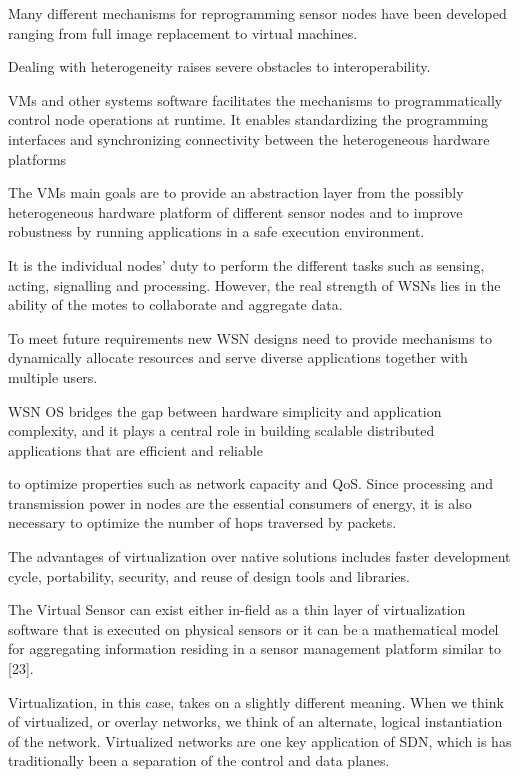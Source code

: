 Many different mechanisms for reprogramming sensor nodes have been developed ranging from full image replacement to virtual machines.

Dealing with heterogeneity raises severe obstacles to interoperability.

VMs and other systems software facilitates the mechanisms to programmatically control node operations at runtime. It enables 
standardizing the programming interfaces and synchronizing connectivity between the heterogeneous hardware platforms

The VMs main goals are to provide an abstraction layer from the possibly heterogeneous hardware platform of different sensor nodes and to improve robustness by running applications in a safe execution environment. 

It is the individual nodes' duty to perform the different tasks such as sensing, acting, signalling and processing. However, the real strength of WSNs lies in the ability of the motes to collaborate and aggregate data.  

To meet future requirements new WSN designs need to provide mechanisms to dynamically allocate resources and serve diverse applications together with multiple users.

WSN OS bridges the gap between hardware simplicity and application complexity, and it plays a central role in building scalable distributed applications that are efficient and reliable

to optimize properties such as network capacity and QoS. Since processing and transmission
power in nodes are the essential consumers of energy, it is
also necessary to optimize the number of hops traversed by
packets.

The advantages of virtualization over native solutions includes faster development cycle, portability, security, and reuse of design tools and libraries.

 The Virtual Sensor can exist
 either in-field as a thin layer of virtualization software that is
 executed on physical sensors or it can be a mathematical
 model for aggregating information residing in a sensor
 management platform similar to [23].

Virtualization, in this case, takes on a slightly different meaning. When we think of virtualized, or overlay networks, we think of an alternate, logical instantiation of the network. Virtualized networks are one key application of SDN, which is has traditionally been a separation of the control and data planes.

